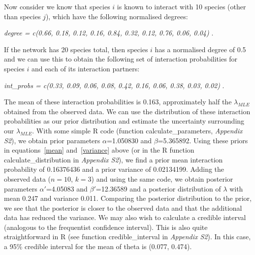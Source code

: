 \documentclass[12pt]{article}
\begin{document}

  Now consider we know that species $i$ is known to interact with 10 species (other than species $j$), which have the following normalised degrees:

    \vspace{12pt}
    \noindent\emph{
       degree = c(0.66, 0.18, 0.12, 0.16, 0.84, 0.32, 0.12, 0.76, 0.06, 0.04)
        }.
      \vspace{12pt}

    If the network has 20 species total, then species $i$ has a normalised degree of 0.5 and
    we can use this to obtain the following set of interaction probabilities for species $i$ and each of its interaction partners:

    \vspace{12pt}
    \noindent\emph{
       int\_probs = c(0.33, 0.09, 0.06, 0.08, 0.42, 0.16, 0.06, 0.38, 0.03, 0.02) }.
      \vspace{12pt}

    The mean of these interaction probabilities is 0.163, approximately half the $\lambda_{MLE}$ obtained from the observed data. We can use the distribution of these interaction probabilities as our prior distribution and estimate the uncertainty surrounding our $\lambda_{MLE}$. With some simple R code (function calculate\_parameters, \emph{Appendix S2}), we obtain prior parameters $\alpha$=1.050830 and $\beta$=5.365892. Using these priors in equations~\ref{mean} and~\ref{variance} above (or in the R function calculate\_distribution in \emph{Appendix S2}), we find a prior mean interaction probability of 0.16376436 and a prior variance of 0.02134199. Adding the observed data ($n=10$, $k=3$) and using the same code, we obtain posterior parameters $\alpha'$=4.05083 and $\beta'$=12.36589 and a posterior distribution of $\lambda$ with mean 0.247 and variance 0.011. Comparing the posterior distribution to the prior, we see that the posterior is closer to the observed data and that the additional data has reduced the variance. We may also wish to calculate a credible interval (analogous to the frequentist confidence interval). This is also quite straightforward in R (see function credible\_interval in \emph{Appendix S2}). In this case, a 95\% credible interval for the mean of theta is (0.077, 0.474).
\end{document}
